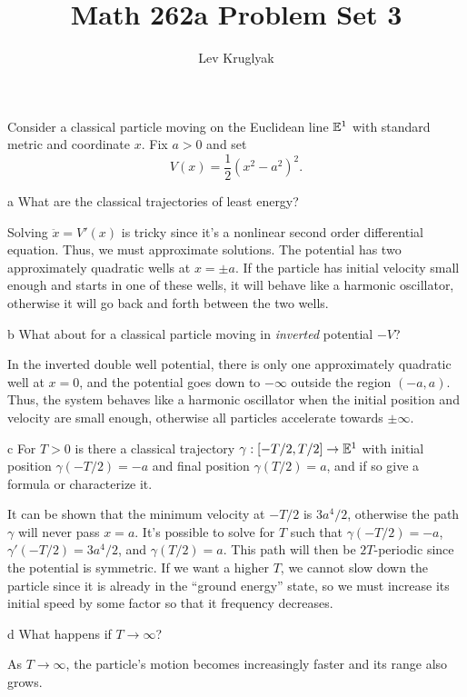\documentclass{pset}
\title{Math 262a Problem Set 3}
\author{Lev Kruglyak}
\theoremstyle{plain}
\begin{document}
\maketitle

\begin{problem}{1}
  Consider a classical particle moving on the Euclidean line $\mathbb{E}^1$ with standard metric and coordinate $x$. Fix $a>0$ and set 
  \[V(x) = \frac{1}{2}(x^2-a^2)^2.\]
\end{problem}

\begin{parts}
  \begin{part}{a}
    What are the classical trajectories of least energy?
  \end{part}

  Solving $\ddot{x} = V'(x)$ is tricky since it's a nonlinear second order differential equation. Thus, we must approximate solutions. The potential has two approximately quadratic wells at $x=\pm a$. If the particle has initial velocity small enough and starts in one of these wells, it will behave like a harmonic oscillator, otherwise it will go back and forth between the two wells.

  \begin{part}{b}
    What about for a classical particle moving in \emph{inverted} potential $-V$?
  \end{part}

  In the inverted double well potential, there is only one approximately quadratic well at $x=0$, and the potential goes down to $-\infty$ outside the region $(-a,a)$. Thus, the system behaves like a harmonic oscillator when the initial position and velocity are small enough, otherwise all particles accelerate towards $\pm\infty$.

  \begin{part}{c}
    For $T > 0$ is there a classical trajectory $\gamma : [- T /2, T /2] \to \mathbb{E}^1$ with initial position $\gamma(-T / 2) = -a$ and final position $\gamma(T /2)=a$, and if so give a formula or characterize it.
  \end{part}

  It can be shown that the minimum velocity at $-T/2$ is $3a^4/2$, otherwise the path $\gamma$ will never pass $x=a$. It's possible to solve for $T$ such that $\gamma(-T/2) = -a$, $\gamma'(-T/2)=3a^4/2$, and $\gamma(T/2)=a$. This path will then be $2T$-periodic since the potential is symmetric. If we want a higher $T$, we cannot slow down the particle since it is already in the ``ground energy'' state, so we must increase its initial speed by some factor so that it frequency decreases.

  \begin{part}{d}
    What happens if $T\to \infty$?
  \end{part}

  As $T\to \infty$, the particle's motion becomes increasingly faster and its range also grows.
\end{parts}
\end{document}
